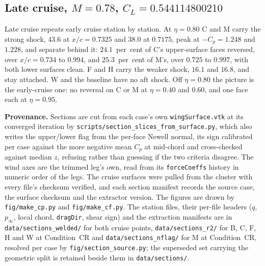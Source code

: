 \subsection{Late cruise, \texorpdfstring{$M = 0.78$, $C_L = 0.544114800210$}{M 0.78, CL 0.544114800210}}
\label{sec:app:sections:lc}

Late cruise repeats early cruise station by station. At $\eta = 0.80$ C and M carry the strong
shock, $43.6$ at $x/c = 0.7325$ and $38.0$ at $0.7175$, peak at $-C_p = 1.248$ and $1.228$, and
separate behind it: $24.1$~per~cent of C's upper-surface faces reversed, over $x/c = 0.734$ to
$0.994$, and $25.3$~per~cent of M's, over $0.725$ to $0.997$, with both lower surfaces clean. F
and H carry the weaker shock, $16.1$ and $16.8$, and stay attached. W and the baseline have no aft
shock. Off $\eta = 0.80$ the picture is the early-cruise one: no reversal on C or M at
$\eta = 0.40$ and $0.60$, and one face each at $\eta = 0.95$.

\textbf{Provenance.} Sections are cut from each case's own \texttt{wingSurface.vtk} at its
converged iteration by \texttt{scripts/section\_slices\_from\_surface.py}, which also writes the
upper/lower flag from the per-face Newell normal, its sign calibrated per case against the more
negative mean $C_p$ at mid-chord and cross-checked against median $z$, refusing rather than
guessing if the two criteria disagree. The wind axes are the trimmed leg's own, read from its
\texttt{forceCoeffs} history in numeric order of the legs. The cruise surfaces were pulled from the
cluster with every file's checksum verified, and each section manifest records the source case,
the surface checksum and the extractor version. The figures are drawn by \texttt{fig/make\_cp.py}
and \texttt{fig/make\_cf.py}. The station files, their per-file headers ($q$, $p_\infty$, local
chord, \texttt{dragDir}, shear sign) and the extraction manifests are in
\texttt{data/sections\_welded/} for both cruise points, \texttt{data/sections\_r2/} for B, C, F,
H and W at Condition~CR and \texttt{data/sections\_nflag/} for M at Condition~CR, resolved per
case by \texttt{fig/section\_source.py}; the superseded set carrying the geometric split is
retained beside them in \texttt{data/sections/}.
